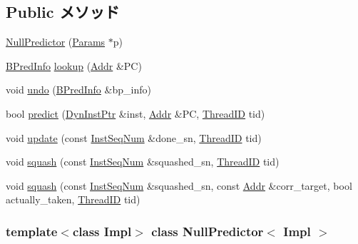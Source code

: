 \subsection*{Public メソッド}
\begin{DoxyCompactItemize}
\item 
\hyperlink{classNullPredictor_af4fda7171866446e9126f9e3f4f38890}{NullPredictor} (\hyperlink{classNullPredictor_a818e103eae798a24a06a0a34631849ea}{Params} $\ast$p)
\item 
\hyperlink{structNullPredictor_1_1BPredInfo}{BPredInfo} \hyperlink{classNullPredictor_ade293a98582b6cd35fbcea295860b657}{lookup} (\hyperlink{base_2types_8hh_af1bb03d6a4ee096394a6749f0a169232}{Addr} \&PC)
\item 
void \hyperlink{classNullPredictor_af8b54e1aafc0215a1ea8efd67adef042}{undo} (\hyperlink{structNullPredictor_1_1BPredInfo}{BPredInfo} \&bp\_\-info)
\item 
bool \hyperlink{classNullPredictor_a7a7d352690772cc95f76b54aaed742db}{predict} (\hyperlink{classNullPredictor_a028ce10889c5f6450239d9e9a7347976}{DynInstPtr} \&inst, \hyperlink{base_2types_8hh_af1bb03d6a4ee096394a6749f0a169232}{Addr} \&PC, \hyperlink{base_2types_8hh_ab39b1a4f9dad884694c7a74ed69e6a6b}{ThreadID} tid)
\item 
void \hyperlink{classNullPredictor_a6e4be480aeb0d4acfb352802ab73a3df}{update} (const \hyperlink{inst__seq_8hh_a258d93d98edaedee089435c19ea2ea2e}{InstSeqNum} \&done\_\-sn, \hyperlink{base_2types_8hh_ab39b1a4f9dad884694c7a74ed69e6a6b}{ThreadID} tid)
\item 
void \hyperlink{classNullPredictor_af62f441ad740da2cd987637cfa87dfe5}{squash} (const \hyperlink{inst__seq_8hh_a258d93d98edaedee089435c19ea2ea2e}{InstSeqNum} \&squashed\_\-sn, \hyperlink{base_2types_8hh_ab39b1a4f9dad884694c7a74ed69e6a6b}{ThreadID} tid)
\item 
void \hyperlink{classNullPredictor_a61d0d996b2d1380dca7322d0b627daf5}{squash} (const \hyperlink{inst__seq_8hh_a258d93d98edaedee089435c19ea2ea2e}{InstSeqNum} \&squashed\_\-sn, const \hyperlink{base_2types_8hh_af1bb03d6a4ee096394a6749f0a169232}{Addr} \&corr\_\-target, bool actually\_\-taken, \hyperlink{base_2types_8hh_ab39b1a4f9dad884694c7a74ed69e6a6b}{ThreadID} tid)
\end{DoxyCompactItemize}
\subsubsection*{template$<$class Impl$>$ class NullPredictor$<$ Impl $>$}



